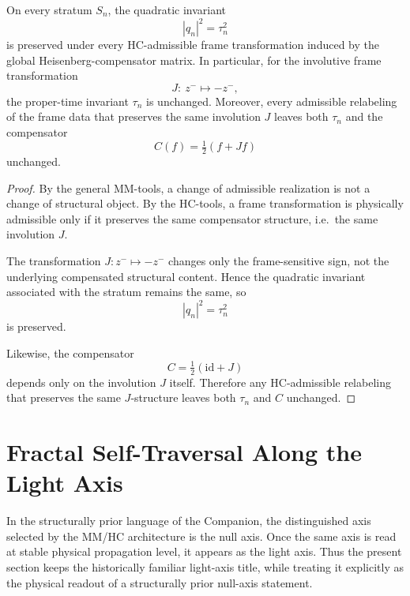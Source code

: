 \begin{theorem}\label{thm:lorentz}
On every stratum $S_n$, the quadratic invariant
\[
|q_n|^2=\tau_n^2
\]
is preserved under every HC-admissible frame transformation induced by
the global Heisenberg-compensator matrix.
In particular, for the involutive frame transformation
\[
J:\ z^- \mapsto -z^-,
\]
the proper-time invariant $\tau_n$ is unchanged.
Moreover, every admissible relabeling of the frame data that preserves
the same involution $J$ leaves both $\tau_n$ and the compensator
\[
C(f)=\tfrac12(f+Jf)
\]
unchanged.
\end{theorem}

\begin{proof}
By the general MM-tools, a change of admissible realization is not a
change of structural object.
By the HC-tools, a frame transformation is physically admissible only if
it preserves the same compensator structure, i.e.\ the same involution
$J$.

The transformation $J:z^-\mapsto -z^-$ changes only the frame-sensitive
sign, not the underlying compensated structural content.
Hence the quadratic invariant associated with the stratum remains the
same, so
\[
|q_n|^2=\tau_n^2
\]
is preserved.

Likewise, the compensator
\[
C=\tfrac12(\mathrm{id}+J)
\]
depends only on the involution $J$ itself.
Therefore any HC-admissible relabeling that preserves the same
$J$-structure leaves both $\tau_n$ and $C$ unchanged.
\end{proof}



\section{Fractal Self-Traversal Along the Light Axis}
\label{sec:fractal}

\begin{remark}
In the structurally prior language of the Companion, the distinguished
axis selected by the MM/HC architecture is the null axis. Once the same
axis is read at stable physical propagation level, it appears as the
light axis. Thus the present section keeps the historically familiar
light-axis title, while treating it explicitly as the physical readout
of a structurally prior null-axis statement.
\end{remark}

